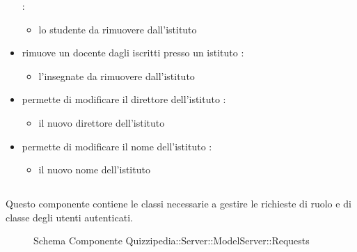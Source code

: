 \begin{itemize}
 :
\begin{itemize}
\item {}
\newline
lo studente da rimuovere dall'istituto
\end{itemize}
\item {}
\newline
rimuove un docente dagli iscritti presso un istituto
\newline
{} :
\begin{itemize}
\item {}
\newline
l'insegnate da rimuovere dall'istituto
\end{itemize}
\item {}
\newline
permette di modificare il direttore dell'istituto
\newline
{} :
\begin{itemize}
\item {}
\newline
il nuovo direttore dell'istituto
\end{itemize}
\item {}
\newline
permette di modificare il nome dell'istituto
\newline
{} :
\begin{itemize}
\item {}
\newline
il nuovo nome dell'istituto
\end{itemize}
\end{itemize}
\subsection{}
Questo componente contiene le classi necessarie a gestire le richieste di ruolo e di classe degli utenti autenticati.
\begin{figure}[H]
\centering
\noindent{}
\caption[Schema Componente Quizzipedia::Server::ModelServer::Requests]{Schema Componente Quizzipedia::Server::ModelServer::Requests}
\end{figure}
